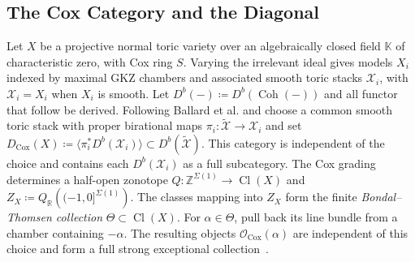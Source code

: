 \documentclass[11pt,reqno]{amsart}
\theoremstyle{remark}
\newcommand{\Cl}{\operatorname{Cl}}
\newcommand{\Cox}{\operatorname{Cox}}
\newcommand{\KK}{\mathbb{K}}
\newcommand{\RR}{\mathbb{R}}
\newcommand{\ZZ}{\mathbb{Z}}
\newcommand{\cO}{\mathcal{O}}
\newcommand{\cX}{\mathcal{X}}
\DeclareMathOperator{\Coh}{Coh}
\begin{document}
\subsection{The Cox Category and the Diagonal}\label{subsec:cox-diagonal}

Let $X$ be a projective normal toric variety over an algebraically closed field $\KK$ of characteristic zero, with Cox ring $S$. Varying the irrelevant ideal gives models $X_i$ indexed by maximal GKZ chambers and associated smooth toric stacks $\cX_i$, with $\cX_i=X_i$ when $X_i$ is smooth. Let $D^b(-) \coloneqq D^{b}(\Coh(-))$ and all functor that follow be derived. Following Ballard et al. and choose a common smooth toric stack with proper birational maps $\pi_i\colon\widetilde{\cX}\to\cX_i$ and set $D_{\Cox}(X) \coloneqq \langle\pi_i^*D^b(\cX_i)\rangle \subset D^b(\widetilde{\cX})$. This category is independent of the choice and contains each $D^b(\cX_i)$ as a full subcategory. The Cox grading determines a half-open zonotope $Q\colon\ZZ^{\Sigma(1)}\longrightarrow\Cl(X)$ and  $Z_X\coloneqq Q_{\RR}\left((-1,0]^{\Sigma(1)}\right)$. The classes mapping into $Z_X$ form the finite \emph{Bondal--Thomsen collection} $\Theta\subset\Cl(X)$. For $\alpha\in\Theta$, pull back its line bundle from a chamber containing $-\alpha$. The resulting objects $\cO_{\Cox}(\alpha)$ are independent of this choice and form a full strong exceptional collection~\cite{longLiveKing}.
\end{document}

